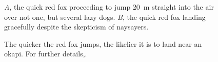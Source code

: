 \documentclass[11pt]{article}
\begin{document}
\begin{figure}[h!]
\caption{\textit{A}, the quick red fox proceeding to jump 20~m straight into the air over not one, but several lazy dogs. \textit{B}, the quick red fox landing gracefully despite the skepticism of naysayers.}
\label{Fig:Jumps}
\end{figure}

\begin{figure}[h!]
\caption{The quicker the red fox jumps, the likelier it is to land near an okapi. For further details,.}
\label{Fig:JumpsOk}
\end{figure}

\renewcommand{\thefigure}{B\arabic{figure}}
\setcounter{figure}{0}
\end{document}

